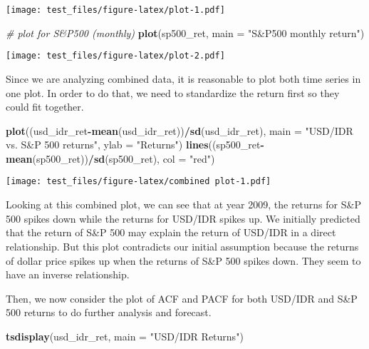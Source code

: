 \documentclass[]{article}
\newenvironment{Shaded}{\begin{snugshade}}{\end{snugshade}}
\newcommand{\KeywordTok}[1]{\textcolor[rgb]{0.13,0.29,0.53}{\textbf{#1}}}
\newcommand{\DataTypeTok}[1]{\textcolor[rgb]{0.13,0.29,0.53}{#1}}
\newcommand{\StringTok}[1]{\textcolor[rgb]{0.31,0.60,0.02}{#1}}
\newcommand{\CommentTok}[1]{\textcolor[rgb]{0.56,0.35,0.01}{\textit{#1}}}
\newcommand{\OperatorTok}[1]{\textcolor[rgb]{0.81,0.36,0.00}{\textbf{#1}}}
\newcommand{\NormalTok}[1]{#1}
\begin{document}
\texttt{[image: test\_files/figure-latex/plot-1.pdf]}

\begin{Shaded}
\begin{Highlighting}[]
\CommentTok{# plot for S&P500 (monthly)}
\KeywordTok{plot}\NormalTok{(sp500_ret, }\DataTypeTok{main =} \StringTok{"S&P500 monthly return"}\NormalTok{) }
\end{Highlighting}
\end{Shaded}

\texttt{[image: test\_files/figure-latex/plot-2.pdf]}

Since we are analyzing combined data, it is reasonable to plot both time
series in one plot. In order to do that, we need to standardize the
return first so they could fit together.

\begin{Shaded}
\begin{Highlighting}[]
\KeywordTok{plot}\NormalTok{((usd_idr_ret}\OperatorTok{-}\KeywordTok{mean}\NormalTok{(usd_idr_ret))}\OperatorTok{/}\KeywordTok{sd}\NormalTok{(usd_idr_ret), }\DataTypeTok{main =} \StringTok{"USD/IDR vs. S&P 500 returns"}\NormalTok{, }\DataTypeTok{ylab =} \StringTok{"Returns"}\NormalTok{)}
\KeywordTok{lines}\NormalTok{((sp500_ret}\OperatorTok{-}\KeywordTok{mean}\NormalTok{(sp500_ret))}\OperatorTok{/}\KeywordTok{sd}\NormalTok{(sp500_ret), }\DataTypeTok{col =} \StringTok{"red"}\NormalTok{)}
\end{Highlighting}
\end{Shaded}

\texttt{[image: test\_files/figure-latex/combined plot-1.pdf]}

Looking at this combined plot, we can see that at year 2009, the returns
for S\&P 500 spikes down while the returns for USD/IDR spikes up. We
initially predicted that the return of S\&P 500 may explain the return
of USD/IDR in a direct relationship. But this plot contradicts our
initial assumption because the returns of dollar price spikes up when
the returns of S\&P 500 spikes down. They seem to have an inverse
relationship.

Then, we now consider the plot of ACF and PACF for both USD/IDR and S\&P
500 returns to do further analysis and forecast.

\begin{Shaded}
\begin{Highlighting}[]
\KeywordTok{tsdisplay}\NormalTok{(usd_idr_ret, }\DataTypeTok{main =} \StringTok{"USD/IDR Returns"}\NormalTok{)}
\end{Highlighting}
\end{Shaded}
\end{document}
